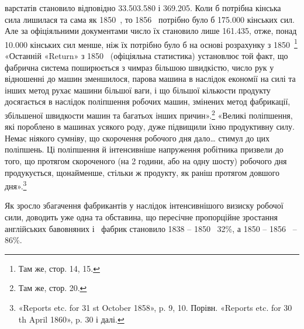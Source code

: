 варстатів становило відповідно \num{33.503.580} і \num{369.205}. Коли б
потрібна кінська сила лишилася та сама як 1850~, то 1856~
потрібно було б \num{175.000} кінських сил. Але за офіціяльними документами
число їх становило лише \num{161.435}, отже, понад \num{10.000}
кінських сил менше, ніж їх потрібно було б на основі розрахунку
з 1850~\footnote{
Там же, стор. 14, 15.
} «Останній «Return» з 1850~ (офіціяльна статистика)
установлює той факт, що фабрична система поширюється з чимраз
більшою швидкістю, число рук у відношенні до машин зменшилося,
парова машина в наслідок економії на силі та інших
метод рухає машини більшої ваги, і що більшої кількости продукту
досягається в наслідок поліпшення робочих машин, змінених
метод фабрикації, збільшеної швидкости машин та багатьох інших
причин».\footnote{
Там же, стор. 20.
} «Великі поліпшення, які пороблено в машинах
усякого роду, дуже підвищили їхню продуктивну силу. Немає
ніякого сумніву, що скорочення робочого дня дало\dots{} стимул
до цих поліпшень. Ці поліпшення й інтенсивніше напруження
робітника призвели до того, що протягом скороченого (на 2 години,
або на одну шосту) робочого дня продукується, щонайменше,
стільки ж продукту, як раніш протягом довшого дня».\footnote{
«Reports etc. for 31 st October 1858», p. 9, 10. Порівн. «Reports
etc. for 30 th April 1860», p. 30 і далі.
}

Як зросло збагачення фабрикантів у наслідок інтенсивнішого
визиску робочої сили, доводить уже одна та обставина, що пересічне
пропорційне зростання англійських бавовняних і~
фабрик становило 1838 – 1850~ 32\%, а 1850 – 1856~ – 86\%.

